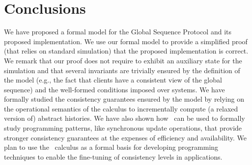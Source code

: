 
\section{Conclusions}
We have proposed a formal model for 
the Global Sequence Protocol and its proposed implementation. We use our formal model 
to provide  a 
simplified proof (that relies on standard  simulation) that the proposed implementation is 
correct. 
We remark that our proof does not require to exhibit an auxiliary state for the simulation  and 
that several 
invariants are trivially ensured by the definition of the model (e.g., the fact that clients have
a consistent view of the global sequence) and the well-formed conditions imposed over systems.  
We have formally studied the consistency guarantees ensured by the model by relying on the 
 operational semantics of the calculus to incrementally compute (a relaxed version of) 
abstract histories. We  have also shown how  \gsp\ can be used to formally study programming patterns, 
like synchronous update operations, that provide stronger consistency guarantees at the expenses of efficiency 
and availability. We plan to use the \gsp\ calculus as a formal basis for 
developing programming techniques to enable the fine-tuning of consistency levels 
in applications. 
